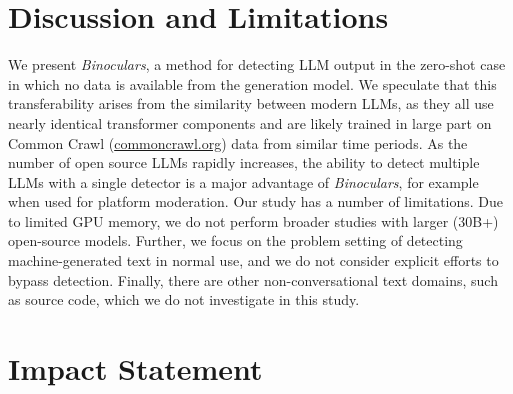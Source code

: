 \documentclass{article} %
\begin{document}
\section{Discussion and Limitations}
\label{sec:discussion}

We present {\em Binoculars}, a method for detecting LLM output in the zero-shot case in which no data is available from the generation model. 
We speculate that this transferability arises from the similarity between modern LLMs, as they all use nearly identical transformer components and are likely trained in large part on Common Crawl (\href{https://commoncrawl.org}{commoncrawl.org}) data from similar time periods.  
As the number of open source LLMs rapidly increases, the ability to detect multiple LLMs with a single detector is a major advantage of {\em Binoculars}, for example when used for platform moderation. %
Our study has a number of limitations.
Due to limited GPU memory, we do not perform broader studies with larger (30B+) open-source models. 
Further, we focus on the problem setting of detecting machine-generated text in normal use, and we do not consider explicit efforts to bypass detection.
Finally, there are other non-conversational text domains, such as source code, which we do not investigate in this study. %




\section*{Impact Statement} %
\label{sec:broader-impact}
\end{document}
